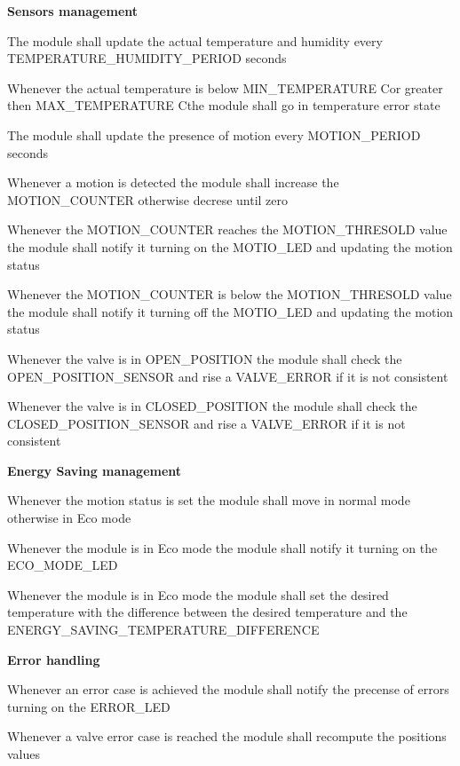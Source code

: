 \begin{req_enum}
	\item \textbf{Sensors management}
		\begin{req_enum}[label*=\arabic*.]
			\item The module shall update the actual temperature and humidity every TEMPERATURE\_HUMIDITY\_PERIOD seconds
			\item Whenever the actual temperature is below MIN\_TEMPERATURE C\degree or greater then MAX\_TEMPERATURE C\degree the module shall go in temperature error state
			\item The module shall update the presence of motion every MOTION\_PERIOD seconds
			\item Whenever a motion is detected the module shall increase the MOTION\_COUNTER otherwise decrese until zero
			\item Whenever the MOTION\_COUNTER reaches the MOTION\_THRESOLD value the module shall notify it turning on the MOTIO\_LED and updating the motion status
			\item Whenever the MOTION\_COUNTER is below the MOTION\_THRESOLD value the module shall notify it turning off the MOTIO\_LED and updating the motion status
			\item Whenever the valve is in OPEN\_POSITION the module shall check the OPEN\_POSITION\_SENSOR and rise a VALVE\_ERROR if it is not consistent
			\item Whenever the valve is in CLOSED\_POSITION the module shall check the CLOSED\_POSITION\_SENSOR and rise a VALVE\_ERROR if it is not consistent
		\end{req_enum}

	\item \textbf{Energy Saving management}
		\begin{req_enum}[label*=\arabic*.]
			\item Whenever the motion status is set the module shall move in normal mode otherwise in Eco mode
			\item Whenever the module is in Eco mode the module shall notify it turning on the ECO\_MODE\_LED
			\item Whenever the module is in Eco mode the module shall set the desired temperature with the difference between the desired temperature and the ENERGY\_SAVING\_TEMPERATURE\_DIFFERENCE
		\end{req_enum}

		\item \textbf{Error handling}
		\begin{req_enum}[label*=\arabic*.]
			\item Whenever an error case is achieved the module shall notify the precense of errors turning on the ERROR\_LED
			\item Whenever a valve error case is reached the module shall recompute the positions values
		\end{req_enum}

\end{req_enum}
